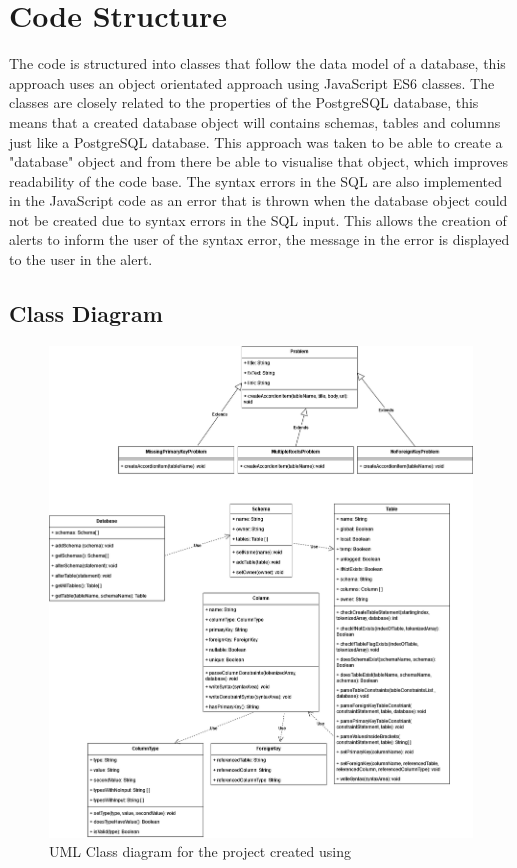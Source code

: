 \section{Code Structure}

The code is structured into classes that follow the data model of a database, this approach uses an object orientated approach using JavaScript ES6 classes. The classes are closely related to the properties of the PostgreSQL database, this means that a created database object will contains schemas, tables and columns just like a PostgreSQL database. This approach was taken to be able to create a "database" object and from there be able to visualise that object, which improves readability of the code base. The syntax errors in the SQL are also implemented in the JavaScript code as an error that is thrown when the database object could not be created due to syntax errors in the SQL input. This allows the creation of alerts to inform the user of the syntax error, the message in the error is displayed to the user in the alert.  

\newpage

\subsection{Class Diagram}

\begin{figure}[h!]
	\centering
	\includegraphics[width=\textwidth]{classDiagram}
	\caption{UML Class diagram for the project created using \cite{dbdiagram}}
	\label{fig:classDiagram}
\end{figure}

